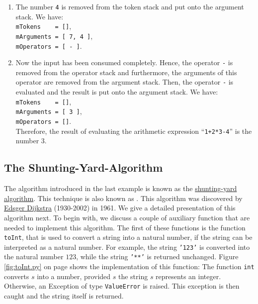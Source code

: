 \begin{enumerate}
\item The number \texttt{4} is removed from the token stack and put onto the argument stack. We have: \\[0.2cm]
      \hspace*{1.3cm} \texttt{mTokens \ \ \ = []}, \\[0.2cm]
      \hspace*{1.3cm} \texttt{mArguments = [ 7, 4 ]}, \\[0.2cm]
      \hspace*{1.3cm} \texttt{mOperators = [ - ]}. 
\item Now the input has been consumed completely.
      Hence, the operator \texttt{-} is removed from the  operator stack and
      furthermore, the arguments of this operator are removed from the argument stack.  Then, the
      operator \texttt{-} is evaluated and the result is put onto the argument
      stack.  We have: \\[0.2cm]
      \hspace*{1.3cm} \texttt{mTokens \ \ \ = []}, \\[0.2cm]
      \hspace*{1.3cm} \texttt{mArguments = [ 3 ]}, \\[0.2cm]
      \hspace*{1.3cm} \texttt{mOperators = []}. \\[0.2cm]
      Therefore, the result of evaluating the arithmetic expression ``\texttt{1+2*3-4}'' is the
      number 3.
\end{enumerate}

\subsection{The Shunting-Yard-Algorithm \label{algo-arith}}
The algorithm introduced in the last example is known as the 
\href{http://en.wikipedia.org/wiki/Shunting-yard_algorithm}{shunting-yard algorithm}.  
This technique is also known as .
This algorithm was discovered by  \href{http://en.wikipedia.org/wiki/Edsger_Dijkstra}{Edsger Dijkstra} (1930-2002) in
1961.  We give a detailed presentation of this algorithm next.  To begin with, we discuss a couple of auxiliary
function that are needed to implement this algorithm.  The first of these functions is the function
\texttt{toInt}, that is used to convert a string into a natural number, if the string can be interpreted as a
natural number.  For example, the string \texttt{'123'} is converted into the natural number $123$, while the
string \texttt{'**'} is returned unchanged.  Figure \ref{fig:toInt.py} on page \pageref{fig:toInt.py} shows the
implementation of this function:  The function \texttt{int} converts $s$ into a number, provided $s$ the string
$s$ represents an integer.  Otherwise, an Exception of type \texttt{ValueError} is raised.  This exception is
then caught and the string itself is returned.


